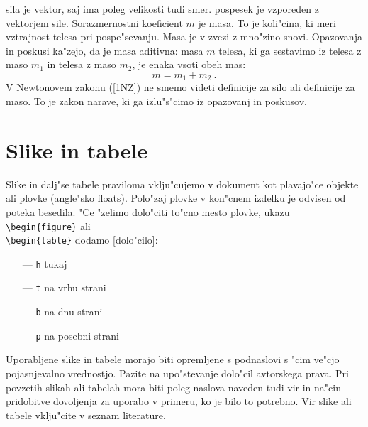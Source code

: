 \ac{sila} je vektor, saj ima poleg velikosti tudi smer. 
\ac{pospesek} je vzporeden z vektorjem sile. 
Sorazmernostni koeficient  $m$ je masa.  To je koli"cina, ki meri vztrajnost telesa pri pospe"sevanju. 
Masa je v zvezi z mno"zino snovi.  Opazovanja in poskusi ka"zejo, da je masa aditivna: 
masa $m$ telesa, ki ga sestavimo iz telesa z maso $m_1$ in telesa z maso $m_2$, je enaka vsoti obeh mas:
$$
m = m_1 + m_2 \>.
$$
V Newtonovem zakonu (\ref{1NZ}) ne smemo videti definicije za silo ali definicije za maso. 
To je zakon narave, ki ga izlu"s"cimo iz opazovanj in poskusov. 

%
\chapter{Slike in tabele}
\label{chSl}

Slike in dalj"se tabele praviloma vklju"cujemo v dokument kot plavajo"ce objekte ali plovke (angle"sko floats).
Polo"zaj plovke v kon"cnem izdelku je odvisen od poteka besedila.
"Ce "zelimo dolo"citi to"cno mesto plovke, ukazu \verb|\begin{figure}|
ali \\ \verb|\begin{table}| dodamo [dolo"cilo]:

\begin{itemize}
\item[---]{{\tt h} \hspace{1 cm} tukaj}
\item[---]{{\tt t} \hspace{1 cm} na vrhu strani}
\item[---]{{\tt b} \hspace{1 cm} na dnu strani}
\item[---]{{\tt p} \hspace{1 cm} na posebni strani}
\end{itemize}

\noindent
Uporabljene slike in tabele morajo biti opremljene s podnaslovi s "cim ve"cjo pojasnjevalno vrednostjo. 
Pazite na upo"stevanje dolo"cil avtorskega prava. Pri povzetih slikah ali tabelah mora biti poleg naslova naveden tudi vir in na"cin pridobitve dovoljenja za uporabo v primeru, ko je bilo to potrebno. 
Vir slike ali tabele vklju"cite v seznam literature.

